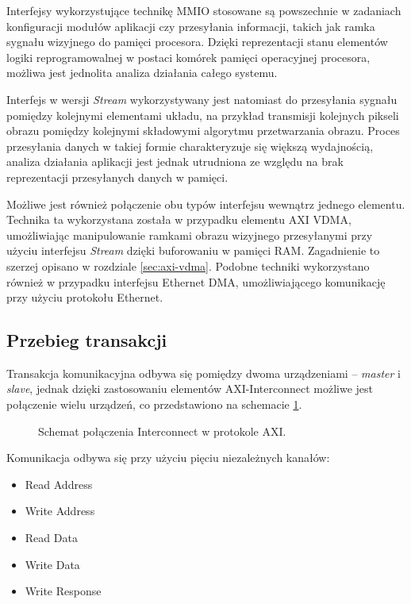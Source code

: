 Interfejsy wykorzystujące technikę MMIO stosowane są powszechnie w zadaniach konfiguracji modułów aplikacji czy przesyłania informacji, takich jak ramka sygnału wizyjnego do pamięci procesora. 
Dzięki reprezentacji stanu elementów logiki reprogramowalnej w postaci komórek pamięci operacyjnej procesora, możliwa jest jednolita analiza działania całego systemu. %

Interfejs w wersji \emph{Stream} wykorzystywany jest natomiast do przesyłania sygnału pomiędzy kolejnymi elementami układu, na przykład transmisji kolejnych pikseli obrazu pomiędzy kolejnymi składowymi algorytmu przetwarzania obrazu. 
Proces przesyłania danych w takiej formie charakteryzuje się większą wydajnością, analiza działania aplikacji jest jednak utrudniona ze względu na brak reprezentacji przesyłanych danych w pamięci.

Możliwe jest również połączenie obu typów interfejsu wewnątrz jednego elementu. 
Technika ta wykorzystana została w przypadku elementu AXI VDMA, umożliwiając manipulowanie ramkami obrazu wizyjnego przesyłanymi przy użyciu interfejsu \emph{Stream} dzięki buforowaniu w pamięci RAM. 
Zagadnienie to szerzej opisano w rozdziale \ref{sec:axi-vdma}. 
Podobne techniki wykorzystano również w przypadku interfejsu Ethernet DMA, umożliwiającego komunikację przy użyciu protokołu Ethernet.

\subsection{Przebieg transakcji}

Transakcja komunikacyjna odbywa się pomiędzy dwoma urządzeniami -- \emph{master} i \emph{slave}, jednak dzięki zastosowaniu elementów AXI-Interconnect możliwe jest połączenie wielu urządzeń, co przedstawiono na schemacie \ref{fig:axi-interconnect}.

\begin{figure}[h]
	\centering
	\def\svgwidth{8cm}
	
	\caption{Schemat połączenia Interconnect w protokole AXI.}
	\label{fig:axi-interconnect}
\end{figure}


Komunikacja odbywa się przy użyciu pięciu niezależnych kanałów:
\begin{itemize}
	\item Read Address
	\item Write Address
	\item Read Data
	\item Write Data
	\item Write Response
\end{itemize}

